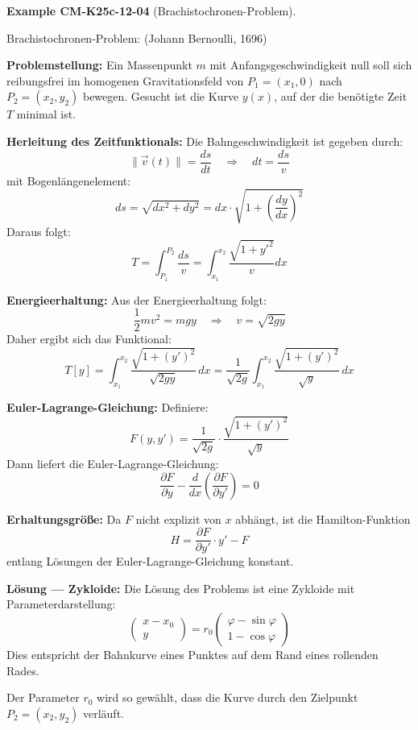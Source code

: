 \documentclass[10pt, letterpaper]{article}
\newcommand{\CustomHeading}[3]{%
  \par\medskip\noindent%
  \textbf{#1 #2} \textnormal{(#3)}.\enskip%
}
\newenvironment{EXA}[2]{\CustomHeading{Example}{#1}{#2}}{}
\begin{document}
\begin{EXA}{CM-K25c-12-04}{Brachistochronen-Problem}
Brachistochronen-Problem: (Johann Bernoulli, 1696)

\begin{center}
\end{center}

\textbf{Problemstellung:} Ein Massenpunkt $m$ mit Anfangsgeschwindigkeit null soll sich reibungsfrei im homogenen Gravitationsfeld von $P_1 = (x_1, 0)$ nach $P_2 = (x_2, y_2)$ bewegen. Gesucht ist die Kurve $y(x)$, auf der die benötigte Zeit $T$ minimal ist.

\textbf{Herleitung des Zeitfunktionals:} Die Bahngeschwindigkeit ist gegeben durch:
\[
\|\vec{v}(t)\| = \frac{ds}{dt} \quad \Rightarrow \quad dt = \frac{ds}{v}
\]
mit Bogenlängenelement:
\[
ds = \sqrt{dx^2 + dy^2} = dx \cdot \sqrt{1 + \left( \frac{dy}{dx} \right)^2}
\]
Daraus folgt:
\[
T = \int_{P_1}^{P_2} \frac{ds}{v} = \int_{x_1}^{x_2} \frac{\sqrt{1 + y'^2}}{v} dx
\]

\textbf{Energieerhaltung:} Aus der Energieerhaltung folgt:
\[
\frac{1}{2}mv^2 = mgy \quad \Rightarrow \quad v = \sqrt{2gy}
\]
Daher ergibt sich das Funktional:
\[
T[y] = \int_{x_1}^{x_2} \frac{\sqrt{1 + (y')^2}}{\sqrt{2gy}}\, dx
= \frac{1}{\sqrt{2g}} \int_{x_1}^{x_2} \frac{\sqrt{1 + (y')^2}}{\sqrt{y}}\, dx
\]

\textbf{Euler-Lagrange-Gleichung:} Definiere:
\[
F(y, y') = \frac{1}{\sqrt{2g}} \cdot \frac{\sqrt{1 + (y')^2}}{\sqrt{y}}
\]
Dann liefert die Euler-Lagrange-Gleichung:
\[
\frac{\partial F}{\partial y} - \frac{d}{dx} \left( \frac{\partial F}{\partial y'} \right) = 0
\]

\textbf{Erhaltungsgröße:} Da $F$ nicht explizit von $x$ abhängt, ist die Hamilton-Funktion
\[
H = \frac{\partial F}{\partial y'} \cdot y' - F
\]
entlang Lösungen der Euler-Lagrange-Gleichung konstant.

\textbf{Lösung — Zykloide:} Die Lösung des Problems ist eine Zykloide mit Parameterdarstellung:
\[
\begin{pmatrix} x - x_0 \\ y \end{pmatrix}
= r_0 \begin{pmatrix} \varphi - \sin\varphi \\ 1 - \cos\varphi \end{pmatrix}
\]
Dies entspricht der Bahnkurve eines Punktes auf dem Rand eines rollenden Rades.

Der Parameter $r_0$ wird so gewählt, dass die Kurve durch den Zielpunkt $P_2 = (x_2, y_2)$ verläuft.
\end{EXA}
\end{document}

